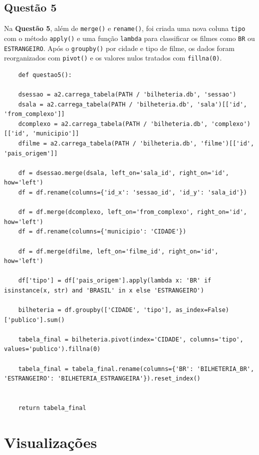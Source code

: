 \documentclass{article}
\begin{document}
\subsection*{Questão 5}
\linespread{1.5}
Na \textbf{Questão 5}, além de \texttt{merge()} e \texttt{rename()}, foi criada uma nova coluna \texttt{tipo} com o método \texttt{apply()} e uma função \texttt{lambda} para classificar os filmes como \texttt{BR} ou \texttt{ESTRANGEIRO}. Após o \texttt{groupby()} por cidade e tipo de filme, os dados foram reorganizados com \texttt{pivot()} e os valores nulos tratados com \texttt{fillna(0)}.
\linespread{1}
\begin{lstlisting}
    def questao5():
    
    dsessao = a2.carrega_tabela(PATH / 'bilheteria.db', 'sessao')
    dsala = a2.carrega_tabela(PATH / 'bilheteria.db', 'sala')[['id', 'from_complexo']]
    dcomplexo = a2.carrega_tabela(PATH / 'bilheteria.db', 'complexo')[['id', 'municipio']]
    dfilme = a2.carrega_tabela(PATH / 'bilheteria.db', 'filme')[['id', 'pais_origem']]

    df = dsessao.merge(dsala, left_on='sala_id', right_on='id', how='left')
    df = df.rename(columns={'id_x': 'sessao_id', 'id_y': 'sala_id'})

    df = df.merge(dcomplexo, left_on='from_complexo', right_on='id', how='left')
    df = df.rename(columns={'municipio': 'CIDADE'})

    df = df.merge(dfilme, left_on='filme_id', right_on='id', how='left')

    df['tipo'] = df['pais_origem'].apply(lambda x: 'BR' if isinstance(x, str) and 'BRASIL' in x else 'ESTRANGEIRO')

    bilheteria = df.groupby(['CIDADE', 'tipo'], as_index=False)['publico'].sum()

    tabela_final = bilheteria.pivot(index='CIDADE', columns='tipo', values='publico').fillna(0)

    tabela_final = tabela_final.rename(columns={'BR': 'BILHETERIA_BR', 'ESTRANGEIRO': 'BILHETERIA_ESTRANGEIRA'}).reset_index()
    

    return tabela_final

\end{lstlisting}
\pagebreak
\section*{Visualizações}
\end{document}
